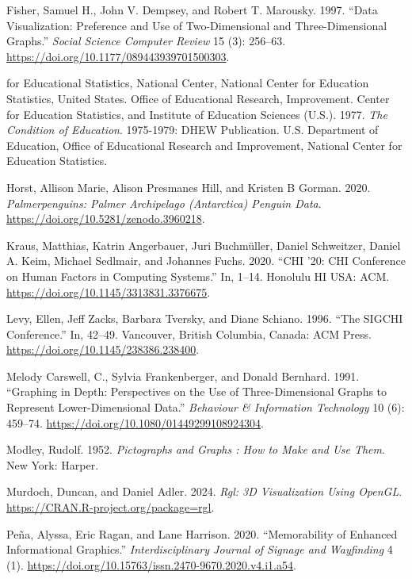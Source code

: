 \documentclass[phd]{nuthesis}
\begin{document}
\begin{CSLReferences}{1}{0}
Fisher, Samuel H., John V. Dempsey, and Robert T. Marousky. 1997.
{``Data Visualization: Preference and Use of Two-Dimensional and
Three-Dimensional Graphs.''} \emph{Social Science Computer Review} 15
(3): 256--63. \url{https://doi.org/10.1177/089443939701500303}.

for Educational Statistics, National Center, National Center for
Education Statistics, United States. Office of Educational Research,
Improvement. Center for Education Statistics, and Institute of Education
Sciences (U.S.). 1977. \emph{The Condition of Education}. 1975-1979:
{DHEW} Publication. {U.S. Department of Education, Office of Educational
Research and Improvement, National Center for Education Statistics}.

Horst, Allison Marie, Alison Presmanes Hill, and Kristen B Gorman. 2020.
\emph{Palmerpenguins: Palmer Archipelago (Antarctica) Penguin Data}.
\url{https://doi.org/10.5281/zenodo.3960218}.

Kraus, Matthias, Katrin Angerbauer, Juri Buchmüller, Daniel Schweitzer,
Daniel A. Keim, Michael Sedlmair, and Johannes Fuchs. 2020. {``CHI '20:
CHI Conference on Human Factors in Computing Systems.''} In, 1--14.
Honolulu HI USA: ACM. \url{https://doi.org/10.1145/3313831.3376675}.

Levy, Ellen, Jeff Zacks, Barbara Tversky, and Diane Schiano. 1996.
{``The SIGCHI Conference.''} In, 42--49. Vancouver, British Columbia,
Canada: ACM Press. \url{https://doi.org/10.1145/238386.238400}.

Melody Carswell, C., Sylvia Frankenberger, and Donald Bernhard. 1991.
{``Graphing in Depth: Perspectives on the Use of Three-Dimensional
Graphs to Represent Lower-Dimensional Data.''} \emph{Behaviour \&
Information Technology} 10 (6): 459--74.
\url{https://doi.org/10.1080/01449299108924304}.

Modley, Rudolf. 1952. \emph{Pictographs and Graphs : How to Make and Use
Them}. New York: Harper.

Murdoch, Duncan, and Daniel Adler. 2024. \emph{Rgl: 3D Visualization
Using OpenGL}. \url{https://CRAN.R-project.org/package=rgl}.

Peña, Alyssa, Eric Ragan, and Lane Harrison. 2020. {``Memorability of
Enhanced Informational Graphics.''} \emph{Interdisciplinary Journal of
Signage and Wayfinding} 4 (1).
\url{https://doi.org/10.15763/issn.2470-9670.2020.v4.i1.a54}.


\end{CSLReferences}
\end{document}

